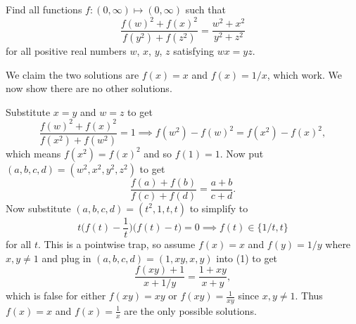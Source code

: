 
\begin{problem}[ISL 2008 A1]
    Find all functions $f : (0, \infty) \mapsto (0, \infty)$ such that \[ \frac{f(w)^2 + f(x)^2}{f(y^2) + f(z^2)} = \frac{w^2 + x^2}{y^2 + z^2} \] for all positive real numbers $w$, $x$, $y$, $z$ satisfying $wx = yz$.
\end{problem}

\begin{solution}
    We claim the two solutions are $f(x) = x$ and $f(x) = 1/x$, which work. We now show there are no other solutions.
    
    Substitute $x = y$ and $w = z$ to get \[\frac{f(w)^2 + f(x)^2}{f(x^2) + f(w^2)} = 1 \implies f(w^2) - f(w)^2 = f(x^2) - f(x)^2,\] which means $f(x^2) = f(x)^2$ and so $f(1) = 1$. Now put $(a,b,c,d) = (w^2, x^2, y^2, z^2)$ to get \[\frac{f(a)+f(b)}{f(c)+f(d)} = \frac{a+b}{c+d}. \tag{1}\] Now substitute $(a,b,c,d) = (t^2, 1, t, t)$ to simplify to \[t\bigg(f(t) - \frac1t\bigg)\bigg(f(t) - t\bigg) = 0 \implies f(t) \in \{1/t, t\}\] for all $t$. This is a pointwise trap, so assume $f(x) = x$ and $f(y) = 1/y$ where $x,y \neq 1$ and plug in $(a,b,c,d) = (1, xy, x, y)$ into (1) to get \[\frac{f(xy) + 1}{x + 1/y} = \frac{1 + xy}{x + y},\] which is false for either $f(xy) = xy$ or $f(xy) = \tfrac{1}{xy}$ since $x,y \neq 1$. Thus $f(x) = x$ and $f(x) = \frac1x$ are the only possible solutions.
\end{solution}
